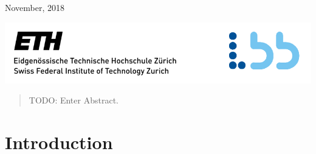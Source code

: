 \begin{titlepage}

{\large November, 2018}\\[2cm] %

\centerline{\includegraphics[scale=0.9]{./pic/ETH_LBB.PNG}}


 

\vfill %

\end{titlepage}


\begin{abstract}
TODO: Enter Abstract.
\end{abstract}

\newpage

\tableofcontents

\newpage



\section{Introduction}







\clearpage
{}










